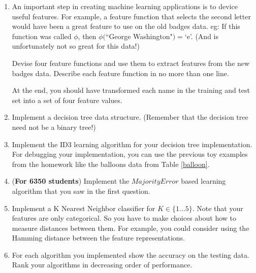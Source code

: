 \begin{enumerate}
\item An important step in creating machine learning applications is
  to device useful features. For example, a feature function that
  selects the second letter would have been a great feature to use on
  the old badges data. eg: If this function was called $\phi$, then
  $\phi($``George Washington"$) = $`e'. (And is unfortunately not so
  great for this data!)
  
  Devise four feature functions and use them to extract features from
  the new badges data. Describe each feature function in no more than
  one line.
  
  At the end, you should have transformed each name in the training
  and test set into a set of four feature values. 

\item Implement a decision tree data structure. (Remember that the
  decision tree need not be a binary tree!)

\item Implement the ID3 learning algorithm for your decision tree
  implementation. For debugging your implementation, you can use the
  previous toy examples from the homework like the balloons data from
  Table \ref{balloon}.

\item ({\bf For 6350 students}) Implement the $MajorityError$ based
  learning algorithm that you saw in the first question.

\item Implement a K Nearest Neighbor classifier for $K \in \{1 \ldots
  5\}$. Note that your features are only categorical. So you have to
  make choices about how to measure distances between them. For
  example, you could consider using the Hamming distance between
  the feature representations.


\item For each algorithm you implemented show the accuracy on the
  testing data. Rank your algorithms in decreasing order of
  performance.

\end{enumerate}

